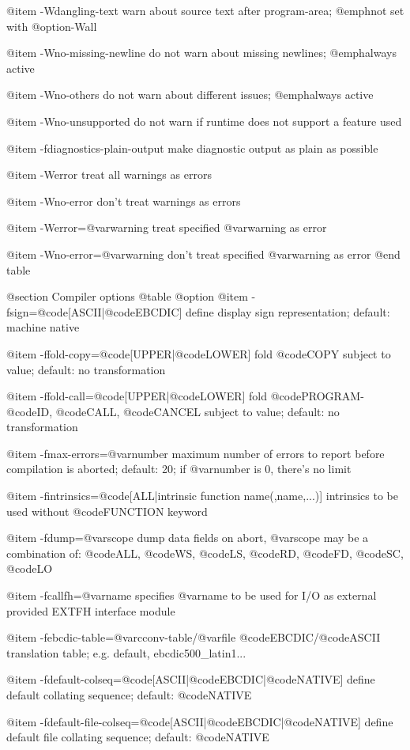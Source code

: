 @item -Wdangling-text
warn about source text after program-area; @emph{not} set with @option{-Wall}

@item -Wno-missing-newline
do not warn about missing newlines; @emph{always} active

@item -Wno-others
do not warn about different issues; @emph{always} active

@item -Wno-unsupported
do not warn if runtime does not support a feature used

@item -fdiagnostics-plain-output
make diagnostic output as plain as possible

@item -Werror
treat all warnings as errors

@item -Wno-error
don't treat warnings as errors

@item -Werror=@var{warning}
treat specified @var{warning} as error

@item -Wno-error=@var{warning}
don't treat specified @var{warning} as error
@end table

@section Compiler options
@table @option
@item -fsign=@code{[ASCII}|@code{EBCDIC]}
define display sign representation; default: machine native

@item -ffold-copy=@code{[UPPER}|@code{LOWER]}
fold @code{COPY} subject to value; default: no transformation

@item -ffold-call=@code{[UPPER}|@code{LOWER]}
fold @code{PROGRAM}-@code{ID}, @code{CALL}, @code{CANCEL} subject to value; default: no transformation

@item -fmax-errors=@var{number}
maximum number of errors to report before
compilation is aborted; default: 20; if @var{number} is 0, there's no limit

@item -fintrinsics=@code{[ALL}|intrinsic function name(,name,...)]
intrinsics to be used without @code{FUNCTION} keyword

@item -fdump=@var{scope}
dump data fields on abort, @var{scope} may be
a combination of: @code{ALL}, @code{WS}, @code{LS}, @code{RD}, @code{FD}, @code{SC}, @code{LO}

@item -fcallfh=@var{name}
specifies @var{name} to be used for I/O
as external provided EXTFH interface module

@item -febcdic-table=@var{cconv-table}/@var{file}
@code{EBCDIC}/@code{ASCII} translation table; e.g. default, ebcdic500_latin1...

@item -fdefault-colseq=@code{[ASCII}|@code{EBCDIC}|@code{NATIVE]}
define default collating sequence; default: @code{NATIVE}

@item -fdefault-file-colseq=@code{[ASCII}|@code{EBCDIC}|@code{NATIVE]}
define default file collating sequence; default: @code{NATIVE}


